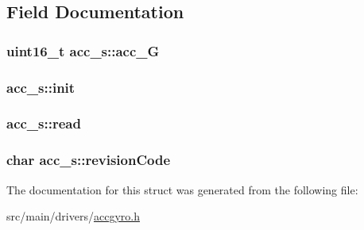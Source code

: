 \subsection{Field Documentation}
\hypertarget{structacc__s_a2f6d54fed86fd1f7fd228262696b5776}{
\subsubsection[{acc\+\_\+1\+G}]{\setlength{\rightskip}{0pt plus 5cm}uint16\+\_\+t acc\+\_\+s\+::acc\+\_\+G}}\label{structacc__s_a2f6d54fed86fd1f7fd228262696b5776}
\hypertarget{structacc__s_a9f24736f8ffd4ef6d58710dac801459e}{
\subsubsection[{init}]{ acc\+\_\+s\+::init}}\label{structacc__s_a9f24736f8ffd4ef6d58710dac801459e}
\hypertarget{structacc__s_af4998a3db3e078f1d27bae030d73edb2}{
\subsubsection[{read}]{ acc\+\_\+s\+::read}}\label{structacc__s_af4998a3db3e078f1d27bae030d73edb2}
\hypertarget{structacc__s_a5c44f57a5845243db9ecc08698dc5dd9}{
\subsubsection[{revision\+Code}]{\setlength{\rightskip}{0pt plus 5cm}char acc\+\_\+s\+::revision\+Code}}\label{structacc__s_a5c44f57a5845243db9ecc08698dc5dd9}


The documentation for this struct was generated from the following file\+:\begin{DoxyCompactItemize}
\item 
src/main/drivers/\hyperlink{accgyro_8h}{accgyro.\+h}\end{DoxyCompactItemize}
